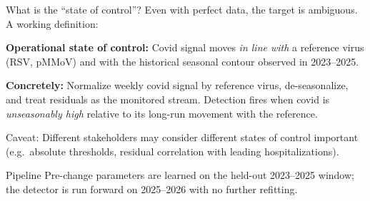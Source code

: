 \documentclass[10pt,aspectratio=169]{beamer}
\begin{document}
\begin{frame}{What is the ``state of control''?}
  Even with perfect data, the target is ambiguous. A working definition:
  \medskip

   \textbf{Operational state of control:} 
    Covid signal moves \emph{in line with} a reference virus
    (RSV, pMMoV) and with the historical seasonal contour observed in
    2023--2025.
  \medskip

  \textbf{Concretely:} Normalize weekly covid signal by reference virus, de-seasonalize,
  and treat residuals as the monitored stream. Detection fires when covid is
  \emph{unseasonably high} relative to its long-run movement with the
  reference.
  \medskip

  \alert{Caveat}:
  Different stakeholders may consider different states of control important
  (e.g.\ absolute thresholds, residual correlation with leading hospitalizations).
\end{frame}

\begin{frame}{Pipeline}
  \centering
  \medskip
  \scriptsize Pre-change parameters are learned on the held-out 2023--2025
  window; the detector is run forward on 2025--2026 with no further refitting.

  
\end{frame}
\end{document}
